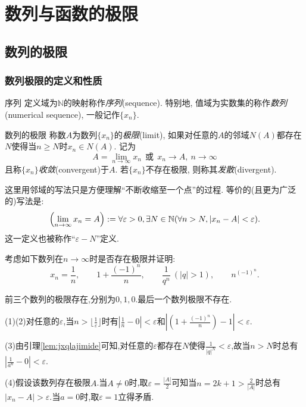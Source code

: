 \chapter{数列与函数的极限}

\section{数列的极限}

\subsection{数列极限的定义和性质}

\begin{definition}{序列}
	定义域为$\mathbb{N}$的映射称作\textit{序列}(sequence). 特别地, 值域为实数集的称作\textit{数列}(numerical sequence), 一般记作$\{ x_n \}$. 
\end{definition}

\begin{definition}{数列的极限}
	称数$A$为数列$\{ x_n \}$的\textit{极限}(limit), 如果对任意的$A$的邻域$N(A)$都存在$N$使得当$n \geq N$时$x_n \in N(A)$. 记为$$A = \lim_{n \to \infty} x_n ~~ \text{或} ~~ x_n \to A,~n \to \infty$$且称$\{ x_n \}$\textit{收敛}(convergent)于$A$. 若$\{ x_n \}$不存在极限, 则称其\textit{发散}(divergent). 
\end{definition}
\begin{remark}
	这里用邻域的写法只是方便理解“不断收缩至一个点”的过程. 等价的(且更为广泛的)写法是: $$\left( \lim_{n \to \infty} x_n = A \right) := \forall \varepsilon > 0 , \exists N \in \mathbb{N} (\forall n>N,|x_n-A|<\varepsilon ).$$
	这一定义也被称作“$\varepsilon -N$”定义.
\end{remark}

\begin{example}
	考虑如下数列在$n\to \infty$时是否存在极限并证明: $$x_n=\frac{1}{n},\qquad 1+\frac{(-1)^n}{n},\qquad \frac{1}{q^n}~(|q|>1),\qquad n^{(-1)^n}.$$
\end{example}
\begin{solution}
	前三个数列的极限存在,分别为$0,1,0$.最后一个数列极限不存在.
	
	(1)(2)对任意的$\varepsilon$,当$n>\lfloor \frac{1}{\varepsilon} \rfloor$时有$|\frac{1}{n} -0|<\varepsilon$和$|(1+\frac{(-1)^n}{n})-1|<\varepsilon$.
	
	(3)由引理\ref{lem:jxqlajimide}可知,对任意的$\varepsilon$都存在$N$使得$\frac{1}{|q|^N}<\varepsilon$,故当$n>N$时总有$|\frac{1}{a^n}-0|<\varepsilon$.
	
	(4)假设该数列存在极限$A$.当$A \neq 0$时,取$\varepsilon = \frac{|A|}{2}$可知当$n=2k+1 > \frac{2}{|A|}$时总有$|x_n-A|>\varepsilon$.当$a=0$时,取$\varepsilon =1$立得矛盾.
\end{solution}

